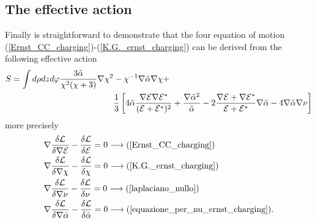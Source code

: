 \subsection{The effective action}
Finally is straightforward to demonstrate that the four equation of motion (\ref{Ernst_CC_charging})-(\ref{K.G._ernst_charging}) can be derived from the following effective action
\begin{align}
        S = \int d\rho dz d\varphi \frac{3 \Tilde{\alpha}}{\chi^2(\chi+3)} \nabla\chi^2 &- \chi^{-1} \nabla\Tilde{\alpha}\nabla\chi \notag + \\ &\frac{1}{3}\left[4\Tilde{\alpha}\frac{\nabla\mathcal{E} \nabla\mathcal{E}^*}{(\mathcal{E}+\mathcal{E}^*)^2} + \frac{\nabla\Tilde{\alpha}^2}{\Tilde{\alpha}} -2\frac{\nabla\mathcal{E}+\nabla\mathcal{E}^*}{\mathcal{E}+\mathcal{E}^*}\nabla\Tilde{\alpha} -4\nabla\Tilde{\alpha}\nabla\nu \right]
\end{align}
more precisely 
\begin{align}
    &\nabla \frac{\delta\mathcal{L}}{\delta\nabla\mathcal{E}} - \frac{\delta\mathcal{L}}{\delta\mathcal{E}} =0 \longrightarrow (\ref{Ernst_CC_charging}) \notag \\
    &\nabla \frac{\delta\mathcal{L}}{\delta\nabla\chi} - \frac{\delta\mathcal{L}}{\delta\chi} =0 \longrightarrow (\ref{K.G._ernst_charging}) \notag \\
    &\nabla \frac{\delta\mathcal{L}}{\delta\nabla\nu} - \frac{\delta\mathcal{L}}{\delta\nu} =0 \longrightarrow (\ref{laplaciano_nullo}) \notag \\
    &\nabla \frac{\delta\mathcal{L}}{\delta\nabla\Tilde{\alpha}} - \frac{\delta\mathcal{L}}{\delta\Tilde{\alpha}} =0 \longrightarrow (\ref{equazione_per_nu_ernst_charging}) \notag.
\end{align}



